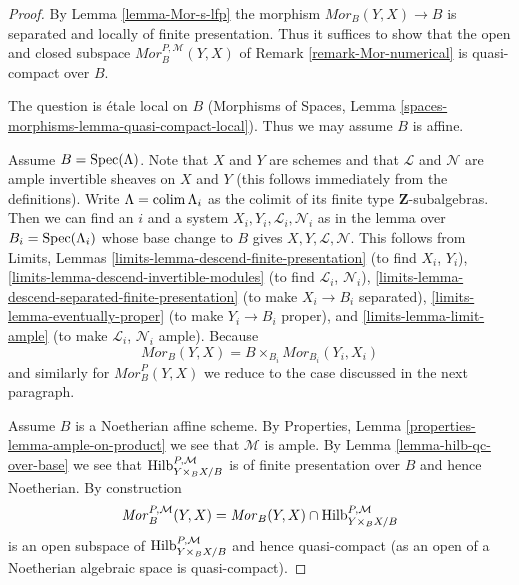 \begin{proof}
By Lemma \ref{lemma-Mor-s-lfp} the morphism $\mathit{Mor}_B(Y, X) \to B$
is separated and locally of finite presentation. Thus it suffices to
show that the open and closed subspace $\mathit{Mor}^{P, \mathcal{M}}_B(Y, X)$
of Remark \ref{remark-Mor-numerical} is quasi-compact over $B$.

\medskip\noindent
The question is \'etale local on $B$
(Morphisms of Spaces, Lemma \ref{spaces-morphisms-lemma-quasi-compact-local}).
Thus we may assume $B$ is affine.

\medskip\noindent
Assume $B = \mathop{\mathrm{Spec}}(\Lambda)$. Note that $X$ and
$Y$ are schemes and that $\mathcal{L}$ and $\mathcal{N}$ are ample
invertible sheaves on $X$ and $Y$ (this follows immediately from the
definitions). Write $\Lambda = \mathop{\mathrm{colim}}\nolimits \Lambda_i$ as the
colimit of its finite type $\mathbf{Z}$-subalgebras. Then
we can find an $i$ and a system $X_i, Y_i, \mathcal{L}_i, \mathcal{N}_i$
as in the lemma over $B_i = \mathop{\mathrm{Spec}}(\Lambda_i)$ whose base change to
$B$ gives $X, Y, \mathcal{L}, \mathcal{N}$. This follows from
Limits, Lemmas
\ref{limits-lemma-descend-finite-presentation} (to find $X_i$, $Y_i$),
\ref{limits-lemma-descend-invertible-modules} (to find $\mathcal{L}_i$,
$\mathcal{N}_i$), \ref{limits-lemma-descend-separated-finite-presentation}
(to make $X_i \to B_i$ separated), \ref{limits-lemma-eventually-proper}
(to make $Y_i \to B_i$ proper), and \ref{limits-lemma-limit-ample}
(to make $\mathcal{L}_i$, $\mathcal{N}_i$ ample).
Because
$$
\mathit{Mor}_B(Y, X) = B \times_{B_i} \mathit{Mor}_{B_i}(Y_i, X_i)
$$
and similarly for $\mathit{Mor}^P_B(Y, X)$ we reduce
to the case discussed in the next paragraph.

\medskip\noindent
Assume $B$ is a Noetherian affine scheme. By
Properties, Lemma \ref{properties-lemma-ample-on-product}
we see that $\mathcal{M}$ is ample. By Lemma \ref{lemma-hilb-qc-over-base}
we see that $\mathrm{Hilb}^{P, \mathcal{M}}_{Y \times_B X/B}$ is of
finite presentation over $B$ and hence Noetherian.
By construction
$$
\mathit{Mor}^{P, \mathcal{M}}_B(Y, X) =
\mathit{Mor}_B(Y, X) \cap
\mathrm{Hilb}^{P, \mathcal{M}}_{Y \times_B X/B}
$$
is an open subspace of $\mathrm{Hilb}^{P, \mathcal{M}}_{Y \times_B X/B}$ and
hence quasi-compact (as an open of a Noetherian algebraic space
is quasi-compact).
\end{proof}

